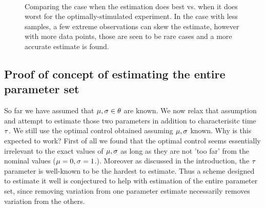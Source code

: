 \begin{figure}[h]
\begin{center} 
\\
\caption[Estimation Detail View for the Optimally-Stimulated
Experiment]{Comparing the case when the estimation does best vs. when it does
worst for the optimally-stimulated experiment. In the case with less samples, a
few extreme observations can skew the estimate, however with more data points,
those are seen to be rare cases and a more accurate estimate is found.}
\label{fig:batch_estimtion_in_detail}
\end{center}
\end{figure}


\subsection{Proof of concept of estimating the entire parameter set}
So far we have assumed that $\mu, \sigma \in { \theta}$ are known. We now relax that
assumption and attempt to estimate those two parameters in addition to
characterisitc time ${ \tau }$. We still use the optimal control obtained assuming
${\mu },\sigma$ known. Why is this expected to work? First of all we found that the
optimal control seems essentially irrelevant to the exact values of ${\mu },\sigma$ as
long as they are not 'too far' from the nominal values (${\mu }=0, \sigma=1$.). Moreover
as discussed in the introduction, the ${ \tau }$ parameter is well-known to be the
hardest to estimate. Thus a scheme designed to estimate it well is conjectured
to help with estimation of the entire parameter set, since removing variation
from one parameter estimate necessarily removes variation from the others.

